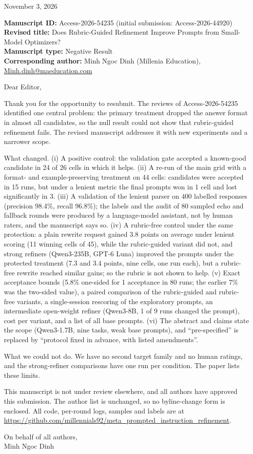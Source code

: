 \documentclass[11pt]{article}
\begin{document}
\begin{flushright}
November 3, 2026
\end{flushright}

\textbf{Manuscript ID:} Access-2026-54235 (initial submission: Access-2026-44920)\\
\textbf{Revised title:} Does Rubric-Guided Refinement Improve Prompts from Small-Model Optimizers?\\
\textbf{Manuscript type:} Negative Result\\
\textbf{Corresponding author:} Minh Ngoc Dinh (Millenia Education), \url{Minh.dinh@maeducation.com}

\bigskip
Dear Editor,

Thank you for the opportunity to resubmit. The reviews of Access-2026-54235 identified one central problem: the primary
treatment dropped the answer format in almost all candidates, so the null result could not show that rubric-guided
refinement fails. The revised manuscript addresses it with new experiments and a narrower scope.

\medskip
What changed. (i) A positive control: the validation gate accepted a known-good candidate in 24 of 26 cells in which it helps.
(ii) A re-run of the main grid with a format- and example-preserving treatment on 44 cells: candidates were accepted in
15 runs, but under a lenient metric the final prompts won in 1 cell and lost significantly in 3.
(iii) A validation of the lenient parser on 400 labelled responses (precision 98.4\%, recall 96.8\%); the labels
and the audit of 80 sampled echo and fallback rounds were produced by a language-model assistant, not by human raters, and
the manuscript says so. (iv) A rubric-free control under the same protection: a plain rewrite request gained 3.8 points on average under lenient scoring (11 winning cells of 45), while the rubric-guided variant did not, and strong refiners (Qwen3-235B, GPT-6 Luna) improved the prompts under the protected treatment (7.3 and 3.4 points, nine cells, one run each), but a rubric-free rewrite reached similar gains; so the rubric is not shown to help. (v) Exact acceptance bounds (5.8\% one-sided for 1 acceptance in 80 runs; the earlier 7\% was
the two-sided value), a paired comparison of the rubric-guided and rubric-free variants, a single-session rescoring of the
exploratory prompts, an intermediate open-weight refiner (Qwen3-8B, 1 of 9 runs changed the prompt), cost per
variant, and a list of all base prompts. (vi) The abstract and claims state the scope (Qwen3-1.7B, nine tasks, weak base
prompts), and ``pre-specified'' is replaced by ``protocol fixed in advance, with listed amendments''.

\medskip
What we could not do. We have no second target family and no human ratings, and the strong-refiner comparisons have one run per condition. The paper lists these limits.

\medskip
This manuscript is not under review elsewhere, and all authors have approved this submission. The author list is unchanged,
so no byline-change form is enclosed. All code, per-round logs, samples and labels are at
\url{https://github.com/millennials92/meta_prompted_instruction_refinement}.

\bigskip
On behalf of all authors,\\
Minh Ngoc Dinh
\end{document}
